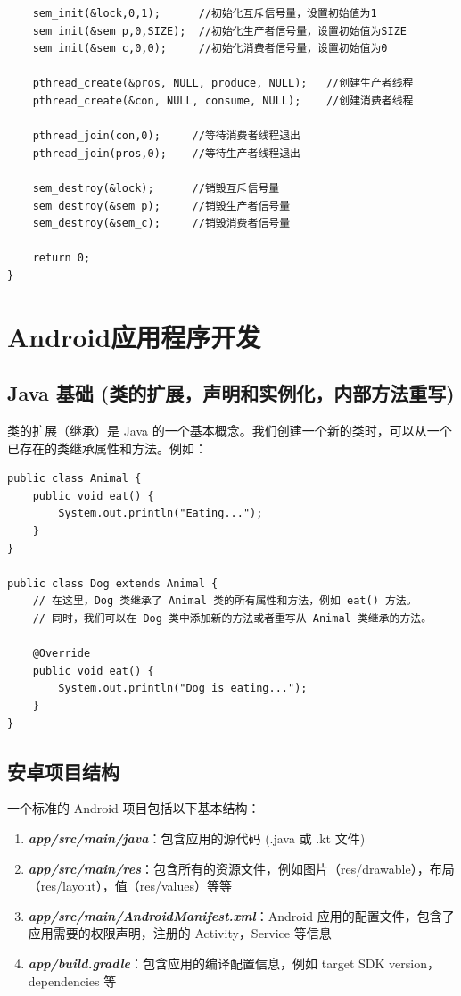 \documentclass[12pt, a4paper, oneside]{ctexbook}
\numberwithin{figure}{section}
\begin{document}
\begin{verbatim}
    sem_init(&lock,0,1);      //初始化互斥信号量，设置初始值为1
    sem_init(&sem_p,0,SIZE);  //初始化生产者信号量，设置初始值为SIZE
    sem_init(&sem_c,0,0);     //初始化消费者信号量，设置初始值为0
    
    pthread_create(&pros, NULL, produce, NULL);   //创建生产者线程
    pthread_create(&con, NULL, consume, NULL);    //创建消费者线程

    pthread_join(con,0);     //等待消费者线程退出
    pthread_join(pros,0);    //等待生产者线程退出

    sem_destroy(&lock);      //销毁互斥信号量
    sem_destroy(&sem_p);     //销毁生产者信号量
    sem_destroy(&sem_c);     //销毁消费者信号量

    return 0;
}

\end{verbatim}

\chapter{Android应用程序开发}
\section{Java 基础 (类的扩展，声明和实例化，内部方法重写)}
类的扩展（继承）是 Java 的一个基本概念。我们创建一个新的类时，可以从一个已存在的类继承属性和方法。例如：

\begin{verbatim}
public class Animal {
    public void eat() {
        System.out.println("Eating...");
    }
}

public class Dog extends Animal {
    // 在这里，Dog 类继承了 Animal 类的所有属性和方法，例如 eat() 方法。
    // 同时，我们可以在 Dog 类中添加新的方法或者重写从 Animal 类继承的方法。
    
    @Override
    public void eat() {
        System.out.println("Dog is eating...");
    }
}

\end{verbatim}

\section{安卓项目结构}
一个标准的 Android 项目包括以下基本结构：
\begin{enumerate}
    \item \textbf{\textit{app/src/main/java}}：包含应用的源代码 (.java 或 .kt 文件)
    \item \textbf{\textit{app/src/main/res}}：包含所有的资源文件，例如图片（res/drawable），布局（res/layout），值（res/values）等等
    \item \textbf{\textit{app/src/main/AndroidManifest.xml}}：Android 应用的配置文件，包含了应用需要的权限声明，注册的 Activity，Service 等信息
    \item \textbf{\textit{app/build.gradle}}：包含应用的编译配置信息，例如 target SDK version，dependencies 等
\end{enumerate}
\end{document}
